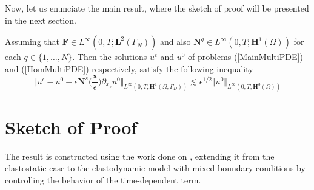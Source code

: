 

Now, let us enunciate the main result, where the sketch of proof will be presented in the next section.
\begin{theo}
Assuming that $\mathbf{F} \in L^{\infty}(0,T;\mathbf{L}^{2}(\Gamma_N))$ and also $\mathbf{N}^q \in L^{\infty}(0,T; \mathbf{H}^1(\Omega))$ for each $q \in \{1,\dots, N\}$. Then the solutions $u^{\epsilon}$ and $u^0$ of problems (\ref{MainMultiPDE}) and (\ref{HomMultiPDE}) respectively, satisfy the following inequality
\begin{equation*}
    \label{MainInequality}
    \Vert u^{\epsilon} - u^0 - \epsilon \mathbf{N}^s \big(\frac{\mathbf{x}}{\epsilon} \big) \partial_{x_s} u^0 \Vert_{L^{\infty}(0,T; \mathbf{H}^1(\Omega, \Gamma_D))} \lesssim \epsilon^{1/2} \Vert u^0 \Vert_{L^{\infty}(0,T; \mathbf{H}^{3}(\Omega))}
\end{equation*}
\end{theo}

\section{Sketch of Proof}
The result is constructed using the work done on \cite{oleinik1992mathematical}, extending it from the elastostatic case to the elastodynamic model with mixed boundary conditions by controlling the behavior of the time-dependent term.

